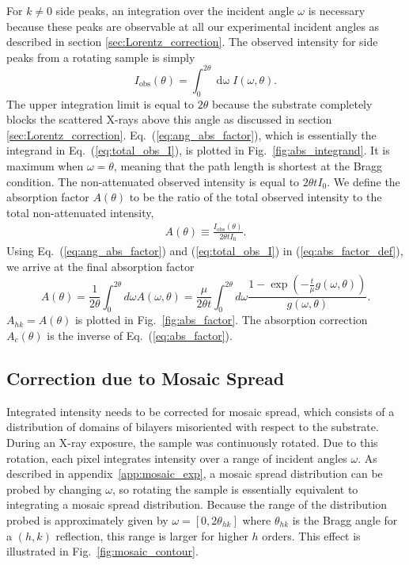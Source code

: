 For $k\neq 0$ side peaks, an integration over the incident angle $\omega$
is necessary because these peaks are observable at all our experimental incident angles as
described in section \ref{sec:Lorentz_correction}.
The observed intensity for side peaks from a rotating sample is simply
\begin{equation}
  I_\textrm{obs}(\theta) 
  = \int_0^{2\theta}\mathop{d\omega} I(\omega,\theta).
  \label{eq:total_obs_I}
\end{equation}
The upper integration limit is equal to $2\theta$ because the substrate
completely blocks the scattered X-rays above this angle as discussed in 
section \ref{sec:Lorentz_correction}. Eq.~(\ref{eq:ang_abs_factor}),
which is essentially the integrand in Eq.~(\ref{eq:total_obs_I}), is 
plotted in Fig.~\ref{fig:abs_integrand}. It is maximum when $\omega=\theta$,
meaning that the path length is shortest at the Bragg condition.
The non-attenuated observed intensity is equal to $2\theta t I_0$. We
define the absorption factor $A(\theta)$ to be the ratio of the total 
observed intensity to the total non-attenuated intensity,
\begin{align}
  A(\theta) \equiv \frac{I_\textrm{obs}(\theta)}{2\theta tI_0}. 
  \label{eq:abs_factor_def}
\end{align}
Using Eq.~(\ref{eq:ang_abs_factor}) and (\ref{eq:total_obs_I})
in (\ref{eq:abs_factor_def}), we arrive
at the final absorption factor
\begin{equation}
  A(\theta) = \frac{1}{2\theta}\int_0^{2\theta}d\omega A(\omega,\theta)
  = \frac{\mu}{2\theta t} \int_0^{2\theta}d\omega 
  \frac{1-\exp\left(-\frac{t}{\mu}g(\omega,\theta)\right)}{g(\omega,\theta)}.
  \label{eq:abs_factor}
\end{equation}
$A_{hk} = A(\theta)$ is plotted in Fig.~\ref{fig:abs_factor}.
The absorption correction $A_c(\theta)$ is the inverse of Eq.~(\ref{eq:abs_factor}). 

\subsection{Correction due to Mosaic Spread}\label{sec:mosaic_spread_correction}
Integrated intensity needs to be corrected for mosaic spread, which consists 
of a distribution of domains of bilayers misoriented with respect to the 
substrate. 
During an X-ray exposure, the sample
was continuously rotated. Due to this rotation, each pixel integrates 
intensity over a range of incident angles $\omega$.
As described in appendix~\ref{app:mosaic_exp}, 
a mosaic spread distribution can be probed
by changing $\omega$, so rotating the sample is essentially  
equivalent to integrating a mosaic spread distribution.
Because the range of the distribution probed is approximately given by $\omega=[0, 2\theta_{hk}]$ 
where $\theta_{hk}$ is the Bragg angle for a $(h,k)$ reflection, 
this range is larger for higher $h$ orders. 
This effect is illustrated in Fig.~\ref{fig:mosaic_contour}.

